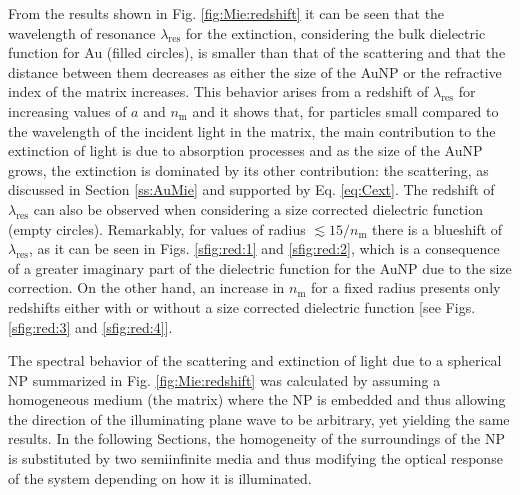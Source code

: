 From the results shown in Fig. \ref{fig:Mie:redshift} it can be seen that the wavelength of resonance  $\lambda_\text{res}$ for the extinction, considering the bulk dielectric function for Au (filled circles), is smaller than that of the scattering  and that the distance between them decreases as either the size of the AuNP or the refractive index of the matrix increases. This behavior arises from a redshift of $\lambda_\text{res}$ for increasing values of $a$ and $n_\text{m}$ and it shows that, for particles small compared to the wavelength of the incident light in the matrix, the main contribution to the extinction of light  is due to absorption processes and as the size of the AuNP grows, the extinction is dominated by its other contribution: the scattering, as discussed in Section \ref{ss:AuMie} and supported by Eq. \eqref{eq:Cext}. The redshift of   $\lambda_\text{res}$ can also be observed when considering a size corrected dielectric function (empty circles). Remarkably, for values of radius $\lesssim 15/n_\text{m}$ there is a blueshift of $\lambda_\text{res}$, as it can be seen in Figs. \ref{sfig:red:1} and \ref{sfig:red:2}, which is a consequence of a greater imaginary part of the dielectric function for the AuNP due to the size correction. On the other hand, an increase in $n_\text{m}$ for a fixed radius presents only redshifts either with or without a size corrected dielectric function [see Figs. \ref{sfig:red:3} and  \ref{sfig:red:4}].

The spectral behavior of the scattering and extinction of light due to a spherical NP summarized in Fig. \ref{fig:Mie:redshift} was calculated by assuming a homogeneous medium (the matrix) where the NP is embedded and thus allowing the direction of the illuminating plane wave to be arbitrary, yet yielding the same results. In the following Sections, the homogeneity of the surroundings of the NP is substituted by two semiinfinite media and thus modifying the optical response of the system depending on how it is illuminated.
